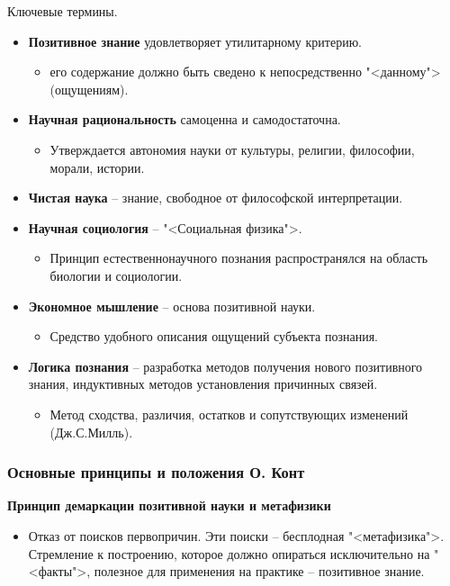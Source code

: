 \documentclass[main.tex]{subfiles}
\begin{document}
{\parindent0pt
Ключевые термины.
\begin{itemize}[topsep=0pt,itemsep=0.1cm,leftmargin=0.5cm]
\item \textbf{Позитивное знание} удовлетворяет утилитарному критерию.
\begin{itemize}[nosep,leftmargin=0.6cm]
\item его содержание должно быть сведено к непосредственно "<данному"> (ощущениям).
\end{itemize}
\item \textbf{Научная рациональность} самоценна и самодостаточна.
\begin{itemize}[nosep,leftmargin=0.6cm]
\item Утверждается автономия науки от культуры, религии, философии, морали, истории.
\end{itemize}
\item \textbf{Чистая наука} -- знание, свободное от философской интерпретации.
\item \textbf{Научная социология} -- "<Социальная физика">.
\begin{itemize}[nosep,leftmargin=0.6cm]
\item Принцип естественнонаучного познания распространялся на область биологии и социологии.
\end{itemize}
\item \textbf{Экономное мышление} -- основа позитивной науки.
\begin{itemize}[nosep,leftmargin=0.6cm]
\item Средство удобного описания ощущений субъекта познания.
\end{itemize}
\item \textbf{Логика познания} -- разработка методов получения нового позитивного знания, индуктивных методов установления причинных связей.
\begin{itemize}[nosep,leftmargin=0.6cm]
\item Метод сходства, различия, остатков и сопутствующих изменений (Дж.С.Милль).
\end{itemize}
\end{itemize}
}



\subsubsection{Основные принципы и положения О. Конт}

{\parindent0pt
\textbf{Принцип демаркации позитивной науки и метафизики}
\begin{itemize}[nosep,leftmargin=0.5cm]
\item Отказ от поисков первопричин.
Эти поиски -- бесплодная "<метафизика">.
Стремление к построению, которое должно опираться исключительно на "<факты">, полезное для применения на практике -- позитивное знание.
\end{itemize}
}
\ 
\end{document}
